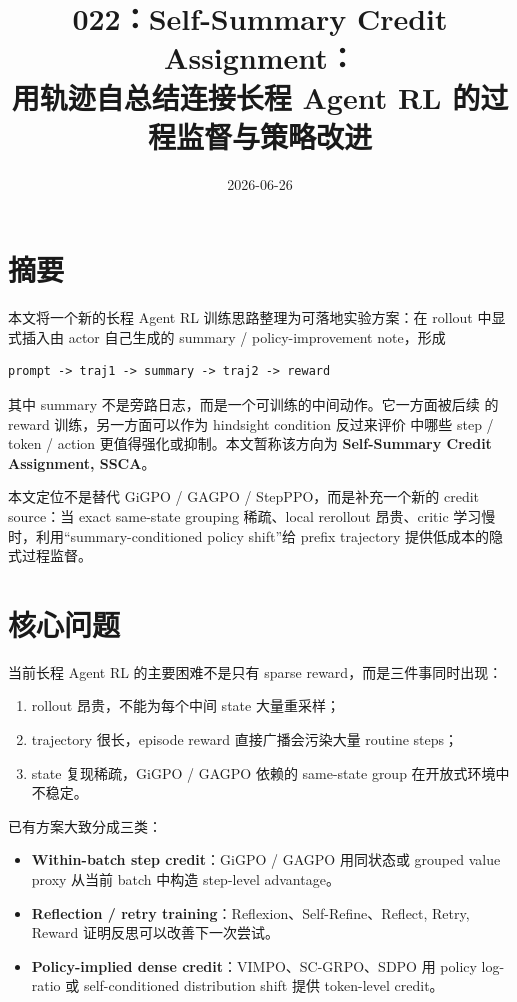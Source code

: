 \documentclass[10pt]{ctexart}
\title{022：Self-Summary Credit Assignment：\\用轨迹自总结连接长程 Agent RL 的过程监督与策略改进}
\author{}
\date{2026-06-26}
\begin{document}
\maketitle
\vspace{-1.2em}

\section*{摘要}
本文将一个新的长程 Agent RL 训练思路整理为可落地实验方案：在 rollout 中显式插入由 actor 自己生成的 summary / policy-improvement note，形成
\begin{lstlisting}
prompt -> traj1 -> summary -> traj2 -> reward
\end{lstlisting}

其中 summary 不是旁路日志，而是一个可训练的中间动作。它一方面被后续  的 reward 训练，另一方面可以作为 hindsight condition 反过来评价  中哪些 step / token / action 更值得强化或抑制。本文暂称该方向为 \textbf{Self-Summary Credit Assignment, SSCA}。

本文定位不是替代 GiGPO / GAGPO / StepPPO，而是补充一个新的 credit source：当 exact same-state grouping 稀疏、local rerollout 昂贵、critic 学习慢时，利用“summary-conditioned policy shift”给 prefix trajectory 提供低成本的隐式过程监督。

\section{核心问题}
当前长程 Agent RL 的主要困难不是只有 sparse reward，而是三件事同时出现：
\begin{enumerate}
  \item rollout 昂贵，不能为每个中间 state 大量重采样；
  \item trajectory 很长，episode reward 直接广播会污染大量 routine steps；
  \item state 复现稀疏，GiGPO / GAGPO 依赖的 same-state group 在开放式环境中不稳定。
\end{enumerate}

已有方案大致分成三类：
\begin{itemize}
  \item \textbf{Within-batch step credit}：GiGPO / GAGPO 用同状态或 grouped value proxy 从当前 batch 中构造 step-level advantage。
  \item \textbf{Reflection / retry training}：Reflexion、Self-Refine、Reflect, Retry, Reward 证明反思可以改善下一次尝试。
  \item \textbf{Policy-implied dense credit}：VIMPO、SC-GRPO、SDPO 用 policy log-ratio 或 self-conditioned distribution shift 提供 token-level credit。
\end{itemize}
\end{document}
